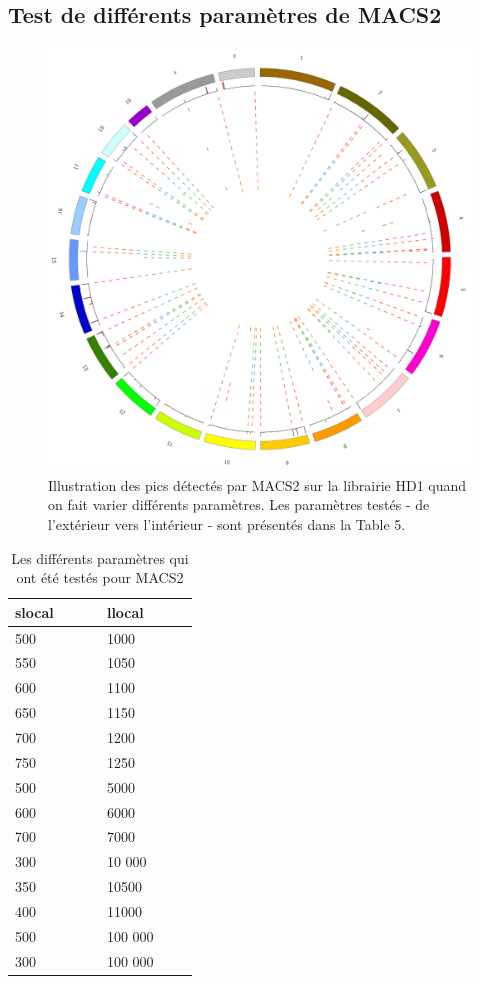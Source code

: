 \documentclass[a4paper,12pt,times]{report}
\newcommand{\scaption}[1]{\caption{\footnotesize{#1}}}
\begin{document}
\begin{appendices}
\subsection{Test de différents paramètres de MACS2}
\begin{figure}[h]
\centering
\includegraphics [scale=0.16]{circos_signal_peak_17_diffPeaks.png}
\scaption{Illustration des pics détectés par MACS2 sur la librairie HD1 quand on fait varier différents paramètres. Les paramètres testés - de l'extérieur vers l'intérieur - sont présentés dans la Table 5. }
\label{MACS2T}
\end{figure}

\begin{table}[!htb]
\centering
 \begin{tabular}{|p{0.333\linewidth}|p{0.333\linewidth}|}
\hline
  slocal &  llocal \\
\hline
500 & 1000    \\
550 & 1050    \\
600 & 1100    \\
650 & 1150    \\
700 & 1200    \\
750 & 1250    \\
\hline
500 & 5000    \\
600 & 6000    \\
700 & 7000    \\
\hline
300 & 10 000    \\
350 & 10500    \\
400 & 11000    \\
\hline
500 & 100 000    \\
300 & 100 000    \\
\hline
\end{tabular}
\scaption{Les différents paramètres qui ont été testés pour MACS2}
\end{table}



\end{appendices}
\end{document}

